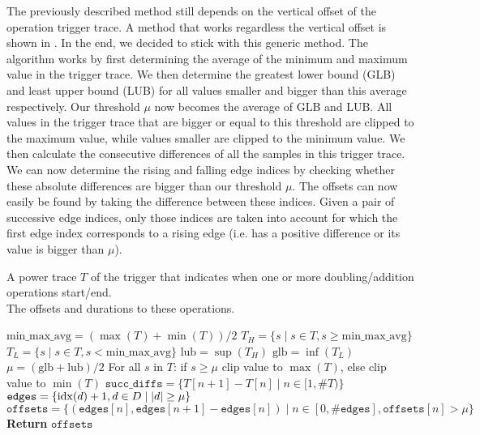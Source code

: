 The previously described method still depends on the vertical offset of the operation trigger trace. 
A method that works regardless the vertical offset is shown in .
In the end, we decided to stick with this generic method.
The algorithm works by first determining the average of the minimum and maximum value in the trigger trace.
We then determine the greatest lower bound (GLB) and least upper bound (LUB) for all values smaller and bigger than this average respectively.
Our threshold $\mu$ now becomes the average of GLB and LUB.
All values in the trigger trace that are bigger or equal to this threshold are clipped to the maximum value, while values smaller are clipped to the minimum value. 
We then calculate the consecutive differences of all the samples in this trigger trace.
We can now determine the rising and falling edge indices by checking whether these absolute differences are bigger than our threshold $\mu$.
The offsets can now easily be found by taking the difference between these indices.
Given a pair of successive edge indices, only those indices are taken into account for which the first edge index corresponds to a rising edge (i.e. has a positive difference or its value is bigger than $\mu$).
%
\begin{algorithm}
	\algorithmicrequire A power trace $T$ of the trigger that indicates when one or more doubling/addition operations start/end. \\
	\algorithmicensure The offsets and durations to these operations.
	\begin{algorithmic}[1]
		\State $\text{min\_max\_avg} = (\max(T) + \min(T)) / 2$
		\State $T_H = \{s \mid s \in T, s \ge \text{min\_max\_avg} \}$
		\State $T_L = \{s \mid s \in T, s < \text{min\_max\_avg} \}$
		\State $\text{lub} = \sup(T_H)$ 
		\State $\text{glb} = \inf(T_L)$ 
		\State $\mu = (\text{glb} + \text{lub}) / 2$
		\State For all $s$ in $T$: if $s \ge \mu$ clip value to $\max(T)$, else clip value to $\min(T)$
		\State $\texttt{succ\_diffs}= \{T[n + 1] - T[n] \mid n \in [1, \#T) \}$ 
		\State $\texttt{edges} = \{\operatorname{idx}(d) + 1, d\in D \mid \abs{d} \ge \mu \}$ 
		\State $\texttt{offsets} = \{(\texttt{edges}[n], \texttt{edges}[n + 1] - \texttt{edges}[n]) \mid n \in [0, \#\texttt{edges} ], \texttt{offsets}[n] > \mu \}$
		\State \textbf{Return} $\texttt{offsets}$
	\end{algorithmic}
	\label{algo: determining offsets}
\end{algorithm}
%